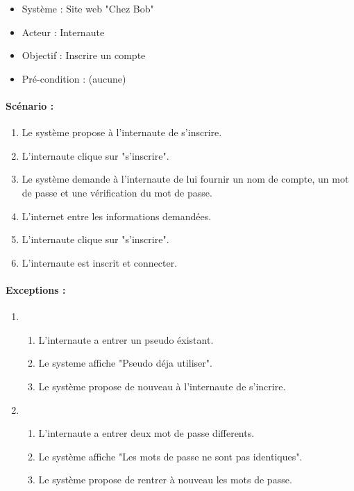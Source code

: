 \begin{boxedminipage}[t]{12cm}
	\begin{itemize}
		\item Système : Site web "Chez Bob"
		\item Acteur : Internaute
		\item Objectif : Inscrire un compte
		\item Pré-condition : (aucune)
	\end{itemize}

	\renewcommand\theenumi{\arabic{enumi}}
	\renewcommand\labelenumi{\theenumi .}
	\renewcommand\theenumii{\Alph{enumii}}
	\renewcommand\labelenumii{(\theenumii)}
	\paragraph{Scénario :} 
	\begin{enumerate}
		\item \label{sc1l1} Le système propose à l'internaute de s'inscrire.
		\item \label{sc1l2} L'internaute clique sur "s'inscrire".
		\item \label{sc1l3} Le système demande à l'internaute de lui fournir un nom de compte, un mot de passe et une vérification du mot de passe.
		\item \label{sc1l4} L'internet entre les informations demandées.
		\item \label{sc1l5} L'internaute clique sur "s'inscrire".
		\item \label{sc1l6} L'internaute est inscrit et connecter.
	\end{enumerate}
	
	\renewcommand\theenumi{\Alph{enumi}}
	\renewcommand\labelenumi{\theenumi)}
	\renewcommand\theenumii{\arabic{enumii}}
	\renewcommand\labelenumii{\theenumii .}
	\paragraph{Exceptions :}
	\begin{enumerate}
		\item
			\begin{enumerate}
				\addtocounter{enumii}{4}
				\item L'internaute a entrer un pseudo éxistant.
				\item Le systeme affiche "Pseudo déja utiliser".
				\item Le système propose de nouveau à l'internaute de s'incrire.
			\end{enumerate}
		\item
			\begin{enumerate}
				\addtocounter{enumii}{4}
				\item L'internaute a entrer deux mot de passe differents.
				\item Le système affiche "Les mots de passe ne sont pas identiques".
				\item Le système propose de rentrer à nouveau les mots de passe.
			\end{enumerate}
	\end{enumerate}	 
			
\end{boxedminipage}
\newpage

